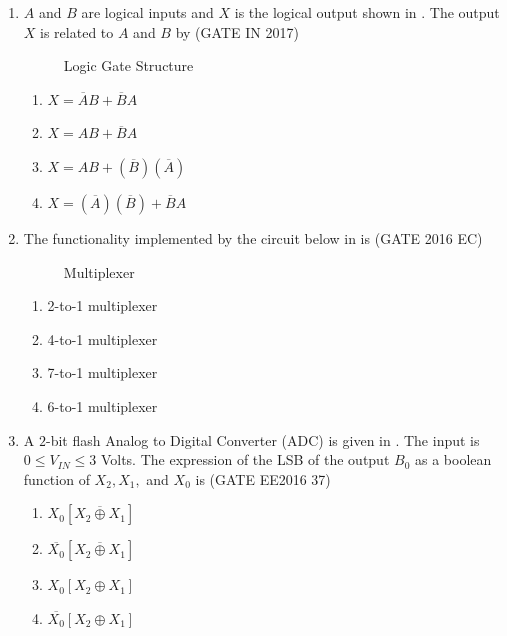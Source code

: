 \begin{enumerate}[label=\arabic*.,ref=\theenumi]
\begin{enumerate}
   \end{enumerate}
\item $A$ and $B$ are logical inputs and $X$ is the logical output shown in 
.
	The output $X$ is related to $A$ and $B$ by \hfill{(GATE IN 2017)}
\begin{figure}[H]
\centering
\resizebox{\columnwidth}{!}{%

	}
\caption{Logic Gate Structure}
\label{fig:gate_in_2017_30}
\end{figure}
\begin{enumerate}[label=\Alph*.]
\item $X = \overline{A}B + \overline{B}A$
\item $X = AB + \overline{B}A$
\item $X = AB + (\overline{B})(\overline{A})$
\item $X = (\overline{A})(\overline{B}) + \overline{B}A$
\end{enumerate}


\item The functionality implemented by the circuit below 
in
	is \hfill{(GATE 2016 EC)}

\begin{figure}[H]
\centering
\resizebox{\columnwidth}{!}{%

	}
\caption{Multiplexer}
\label{fig:gate_ec_2016_43}
\end{figure}

\begin{enumerate}[label=\Alph*.]
\item 2-to-1 multiplexer
\item 4-to-1 multiplexer
\item 7-to-1 multiplexer
\item 6-to-1 multiplexer
\end{enumerate}
\item A $2$-bit flash Analog to Digital Converter (ADC) is given in . The input is $0 \leq V_{IN} \leq 3$ Volts. The expression of the LSB of the output $B_0$ as a boolean function of $X_2,X_1,$ and $X_0$ is \hfill(GATE EE2016 37)
\begin{figure}[H]
\centering
\resizebox{\columnwidth}{!}{%

	}
\caption{}
\label{EE2016_37_fig1}
\end{figure}
\begin{enumerate}
\item $X_0 \left[ \overline {X_2 \oplus X_1} \right]$
\item $\overline {X_0} \left[ \overline {X_2 \oplus X_1} \right]$
\item $X_0 \left[ X_2 \oplus X_1 \right]$
\item $\overline{X_0} \left[ X_2 \oplus X_1 \right]$
\end{enumerate}


\end{enumerate}
